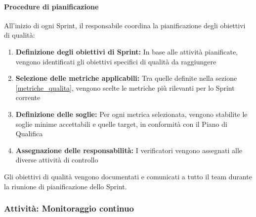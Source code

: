 \documentclass[a4paper,12pt]{article}
\begin{document}
\paragraph{Procedure di pianificazione}
All'inizio di ogni Sprint, il responsabile coordina la pianificazione degli obiettivi di qualità:
\begin{enumerate}
    \item \textbf{Definizione degli obiettivi di Sprint:} In base alle attività pianificate, vengono identificati gli obiettivi specifici di qualità da raggiungere
    \item \textbf{Selezione delle metriche applicabili:} Tra quelle definite nella sezione \ref{metriche_qualita}, vengono scelte le metriche più rilevanti per lo Sprint corrente
    \item \textbf{Definizione delle soglie:} Per ogni metrica selezionata, vengono stabilite le soglie minime accettabili e quelle target, in conformità con il Piano di Qualifica
    \item \textbf{Assegnazione delle responsabilità:} I verificatori vengono assegnati alle diverse attività di controllo
\end{enumerate}

Gli obiettivi di qualità vengono documentati e comunicati a tutto il team durante la riunione di pianificazione dello Sprint.

\subsubsection{Attività: Monitoraggio continuo}\label{monitoraggio_continuo}
\end{document}
